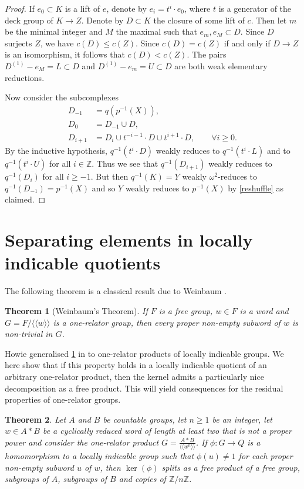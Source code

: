 \documentclass{amsart}
\newtheorem{theorem}{Theorem}[section]
\theoremstyle{definition}
\newcommand{\Z}{\mathbb{Z}}
\newcommand{\normal}[1]{\langle\!\langle #1 \rangle\!\rangle}
\begin{document}
\begin{proof}
    If $e_0\subset K$ is a lift of $e$, denote by $e_i = t^i\cdot e_0$, where $t$ is a generator of the deck group of $K\to Z$. Denote by $D\subset K$ the closure of some lift of $c$. Then let $m$ be the minimal integer and $M$ the maximal such that $e_m, e_M\subset D$. Since $D$ surjects $Z$, we have $c(D)\leqslant c(Z)$. Since $c(D) = c(Z)$ if and only if $D\to Z$ is an isomorphism, it follows that $c(D)<c(Z)$. The pairs $D^{(1)} - e_M = L\subset D$ and $D^{(1)} - e_m = U\subset D$ are both weak elementary reductions.

Now consider the subcomplexes 
\begin{align*}
D_{-1} &= q(p^{-1}(X)),\\
D_0 &= D_{-1}\cup D,\\
D_{i+1} &= D_i \cup t^{-i-1}\cdot D\cup t^{i+1}\cdot D, \qquad \forall i\geqslant 0.
\end{align*}
By the inductive hypothesis, $q^{-1}(t^i\cdot D)$ weakly reduces to $q^{-1}(t^i\cdot L)$ and to $q^{-1}(t^i\cdot U)$ for all $i\in \Z$. Thus we see that $q^{-1}(D_{i+1})$ weakly reduces to $q^{-1}(D_i)$ for all $i\geqslant -1$. But then $q^{-1}(K) = Y$ weakly $\omega^2$-reduces to $q^{-1}(D_{-1}) = p^{-1}(X)$ and so $Y$ weakly reduces to $p^{-1}(X)$ by \cref{reshuffle} as claimed.
\end{proof}



\section{Separating elements in locally indicable quotients}

The following theorem is a classical result due to Weinbaum \cite{We72}.

\begin{theorem}[Weinbaum's Theorem]
\label{weinbaum}
If $F$ is a free group, $w\in F$ is a word and $G = F/\normal{w}$ is a one-relator group, then every proper non-empty subword of $w$ is non-trivial in $G$.
\end{theorem}

Howie generalised \cref{weinbaum} in \cite{Ho82} to one-relator products of locally indicable groups. We here show that if this property holds in a locally indicable quotient of an arbitrary one-relator product, then the kernel admits a particularly nice decomposition as a free product. This will yield consequences for the residual properties of one-relator groups.

\begin{theorem}
\label{free_kernel}
 Let $A$ and $B$ be countable groups, let $n\geqslant 1$ be an integer, let $w\in A*B$ be a cyclically reduced word of length at least two that is not a proper power and consider the one-relator product $G = \frac{A*B}{\normal{w^n}}$. If $\phi\colon G\to Q$ is a homomorphism to a locally indicable group such that $\phi(u)\neq 1$ for each proper non-empty subword $u$ of $w$, then $\ker(\phi)$ splits as a free product of a free group, subgroups of $A$, subgroups of $B$ and copies of $\Z/n\Z$.
\end{theorem}
\end{document}
